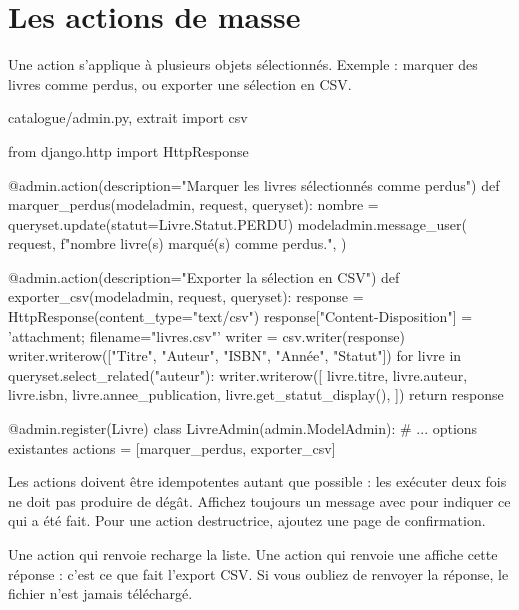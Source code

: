 \section{Les actions de masse}

Une action s'applique à plusieurs objets sélectionnés. Exemple : marquer des livres
comme perdus, ou exporter une sélection en CSV.

\begin{codebox}[python]{catalogue/admin.py, extrait}
import csv

from django.http import HttpResponse


@admin.action(description="Marquer les livres sélectionnés comme perdus")
def marquer_perdus(modeladmin, request, queryset):
    nombre = queryset.update(statut=Livre.Statut.PERDU)
    modeladmin.message_user(
        request,
        f"{nombre} livre(s) marqué(s) comme perdus.",
    )


@admin.action(description="Exporter la sélection en CSV")
def exporter_csv(modeladmin, request, queryset):
    response = HttpResponse(content_type="text/csv")
    response["Content-Disposition"] = 'attachment; filename="livres.csv"'
    writer = csv.writer(response)
    writer.writerow(["Titre", "Auteur", "ISBN", "Année", "Statut"])
    for livre in queryset.select_related("auteur"):
        writer.writerow([
            livre.titre,
            livre.auteur,
            livre.isbn,
            livre.annee_publication,
            livre.get_statut_display(),
        ])
    return response


@admin.register(Livre)
class LivreAdmin(admin.ModelAdmin):
    # ... options existantes
    actions = [marquer_perdus, exporter_csv]
\end{codebox}

\begin{bonne}
Les actions doivent être idempotentes autant que possible : les exécuter deux fois
ne doit pas produire de dégât. Affichez toujours un message avec
 pour indiquer ce qui a été fait. Pour une action destructrice,
ajoutez une page de confirmation.
\end{bonne}

\begin{piege}
Une action qui renvoie  recharge la liste. Une action qui renvoie une
 affiche cette réponse : c'est ce que fait l'export CSV. Si
vous oubliez de renvoyer la réponse, le fichier n'est jamais téléchargé.
\end{piege}

